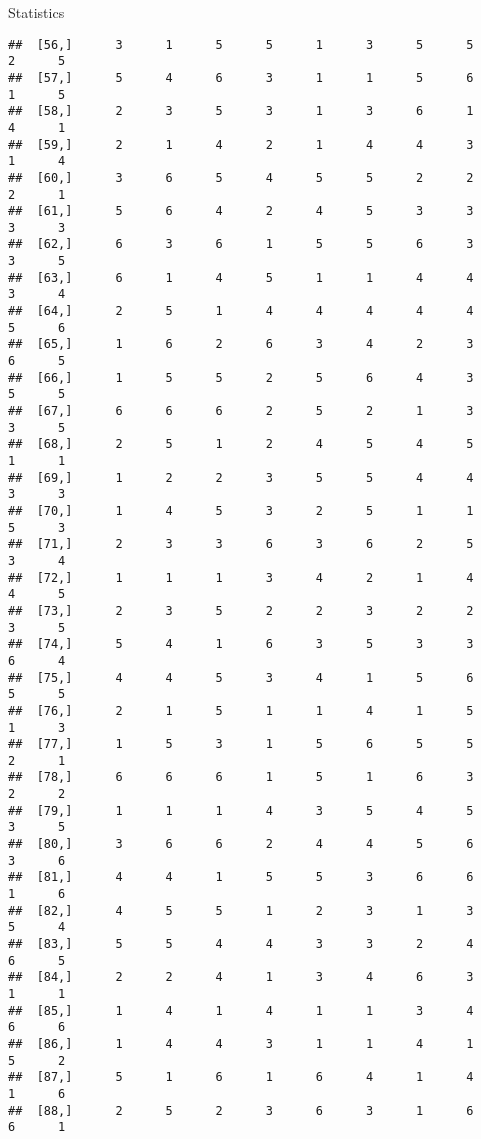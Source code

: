 \documentclass[
  ignorenonframetext,
]{beamer}
\begin{document}
\begin{frame}[fragile]{Statistics}
\begin{verbatim}
##  [56,]      3      1      5      5      1      3      5      5      2      5
##  [57,]      5      4      6      3      1      1      5      6      1      5
##  [58,]      2      3      5      3      1      3      6      1      4      1
##  [59,]      2      1      4      2      1      4      4      3      1      4
##  [60,]      3      6      5      4      5      5      2      2      2      1
##  [61,]      5      6      4      2      4      5      3      3      3      3
##  [62,]      6      3      6      1      5      5      6      3      3      5
##  [63,]      6      1      4      5      1      1      4      4      3      4
##  [64,]      2      5      1      4      4      4      4      4      5      6
##  [65,]      1      6      2      6      3      4      2      3      6      5
##  [66,]      1      5      5      2      5      6      4      3      5      5
##  [67,]      6      6      6      2      5      2      1      3      3      5
##  [68,]      2      5      1      2      4      5      4      5      1      1
##  [69,]      1      2      2      3      5      5      4      4      3      3
##  [70,]      1      4      5      3      2      5      1      1      5      3
##  [71,]      2      3      3      6      3      6      2      5      3      4
##  [72,]      1      1      1      3      4      2      1      4      4      5
##  [73,]      2      3      5      2      2      3      2      2      3      5
##  [74,]      5      4      1      6      3      5      3      3      6      4
##  [75,]      4      4      5      3      4      1      5      6      5      5
##  [76,]      2      1      5      1      1      4      1      5      1      3
##  [77,]      1      5      3      1      5      6      5      5      2      1
##  [78,]      6      6      6      1      5      1      6      3      2      2
##  [79,]      1      1      1      4      3      5      4      5      3      5
##  [80,]      3      6      6      2      4      4      5      6      3      6
##  [81,]      4      4      1      5      5      3      6      6      1      6
##  [82,]      4      5      5      1      2      3      1      3      5      4
##  [83,]      5      5      4      4      3      3      2      4      6      5
##  [84,]      2      2      4      1      3      4      6      3      1      1
##  [85,]      1      4      1      4      1      1      3      4      6      6
##  [86,]      1      4      4      3      1      1      4      1      5      2
##  [87,]      5      1      6      1      6      4      1      4      1      6
##  [88,]      2      5      2      3      6      3      1      6      6      1

\end{verbatim}
\end{frame}
\end{document}
